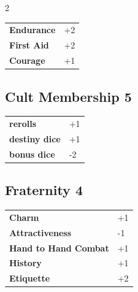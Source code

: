 \begin{multicols}{2}
\begin{tcolorbox}
\begin{tabular}{@{}ll@{}}
    \textbf{Endurance} & +2\\
    \textbf{First Aid} & +2\\
    \textbf{Courage} & +1\\
\end{tabular}


\end{tcolorbox}

\begin{tcolorbox}
    \subsection*{Cult Membership \hfill \small{5 }}
    \tcblower




\begin{tabular}{@{}ll@{}}
    \textbf{rerolls} & +1\\
    \textbf{destiny dice} & +1\\
    \textbf{bonus dice} & -2\\
\end{tabular}


\end{tcolorbox}

\begin{tcolorbox}
    \subsection*{Fraternity \hfill \small{4 }}
    \tcblower




\begin{tabular}{@{}ll@{}}
    \textbf{Charm} & +1\\
    \textbf{Attractiveness} & -1\\
    \textbf{Hand to Hand Combat} & +1\\
    \textbf{History} & +1\\
    \textbf{Etiquette} & +2\\
\end{tabular}


\end{tcolorbox}
\end{multicols}
